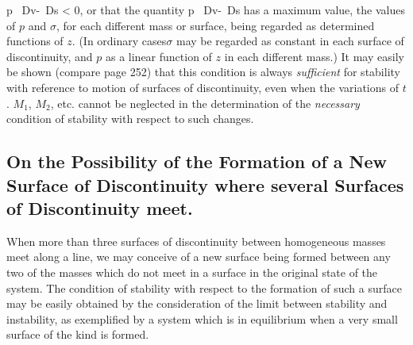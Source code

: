 \documentclass[12pt]{article}
\begin{document}
\eqs\Delta \int p \, Dv-\Delta \int \sigma \, Ds < 0,       \label{624} \eqe
or that the quantity
\eqs \int p \, Dv-\int \sigma \, Ds        \label{625} \eqe
has a maximum value, the values of $p$ and $\sigma$, for each different mass or surface, being regarded as determined functions of $z$. (In ordinary cases$\sigma$ may be regarded as constant in each surface of discontinuity, and $p$ as a linear function of $z$ in each different mass.) It may easily be shown (compare page 252) that this condition is always \textit{sufficient} for stability with reference to motion of surfaces of discontinuity, even when the variations of $t$. $M_1$, $M_2$, etc. cannot be neglected in the determination of the \textit{necessary} condition of stability with respect to such changes.
\subsection{On the Possibility of the Formation of a New Surface of Discontinuity where several Surfaces of Discontinuity meet.}
When more than three surfaces of discontinuity between homogeneous masses meet along a line, we may conceive of a new surface being formed between any two of the masses which do not meet in a surface in the original state of the system. The condition of stability with respect to the formation of such a surface may be easily obtained by the consideration of the limit between stability and instability, as exemplified by a system which is in equilibrium when a very small surface of the kind is formed.
\end{document}
